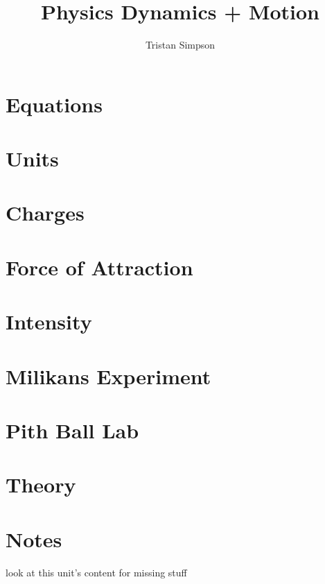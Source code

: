 \documentclass{article}
\title{Physics Dynamics + Motion}
\author{Tristan Simpson}
\begin{document}
\maketitle

\section{Equations}

\section{Units}

\section{Charges}

\section{Force of Attraction}

\section{Intensity}

\section{Milikans Experiment}

\section{Pith Ball Lab}

\section{Theory}

\section{Notes}
look at this unit's content for missing stuff
\end{document}
